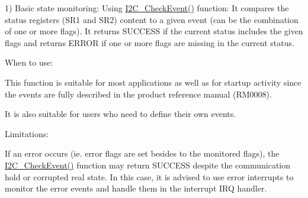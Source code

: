 1) Basic state monitoring\+: Using \hyperlink{group___i2_c___private___functions_ga2d5701342f9d4c1f09bf9d3cdcacc326}{I2\+C\+\_\+\+Check\+Event()} function\+: It compares the status registers (S\+R1 and S\+R2) content to a given event (can be the combination of one or more flags). It returns S\+U\+C\+C\+E\+SS if the current status includes the given flags and returns E\+R\+R\+OR if one or more flags are missing in the current status.
\begin{DoxyItemize}
\item When to use\+:
\begin{DoxyItemize}
\item This function is suitable for most applications as well as for startup activity since the events are fully described in the product reference manual (R\+M0008).
\item It is also suitable for users who need to define their own events.
\end{DoxyItemize}
\item Limitations\+:
\begin{DoxyItemize}
\item If an error occurs (ie. error flags are set besides to the monitored flags), the \hyperlink{group___i2_c___private___functions_ga2d5701342f9d4c1f09bf9d3cdcacc326}{I2\+C\+\_\+\+Check\+Event()} function may return S\+U\+C\+C\+E\+SS despite the communication hold or corrupted real state. In this case, it is advised to use error interrupts to monitor the error events and handle them in the interrupt I\+RQ handler.


\end{DoxyItemize}
\end{DoxyItemize}

